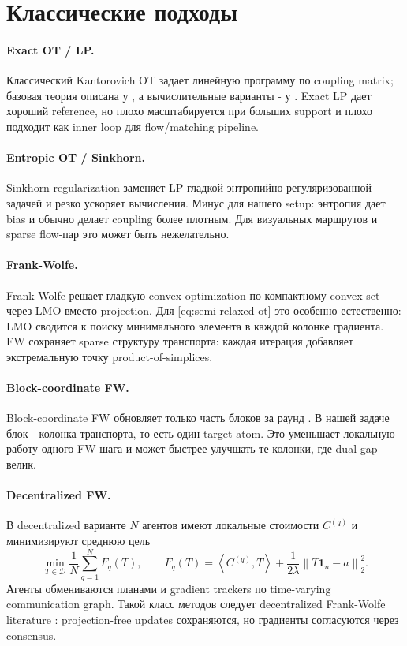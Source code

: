 \documentclass[11pt,a4paper]{article}
\newcommand{\one}{\mathbf{1}}
\newcommand{\ip}[2]{\left\langle #1,#2 \right\rangle}
\newcommand{\norm}[1]{\left\lVert #1 \right\rVert}
\begin{document}
\section{Классические подходы}

\paragraph{Exact OT / LP.}
Классический Kantorovich OT задает линейную программу по coupling matrix; базовая теория описана у \citet{villani2009optimal}, а вычислительные варианты - у \citet{peyre2019computational}. Exact LP дает хороший reference, но плохо масштабируется при больших support и плохо подходит как inner loop для flow/matching pipeline.

\paragraph{Entropic OT / Sinkhorn.}
Sinkhorn regularization \citep{cuturi2013sinkhorn} заменяет LP гладкой энтропийно-регуляризованной задачей и резко ускоряет вычисления. Минус для нашего setup: энтропия дает bias и обычно делает coupling более плотным. Для визуальных маршрутов и sparse flow-пар это может быть нежелательно.

\paragraph{Frank-Wolfe.}
Frank-Wolfe \citep{frank1956algorithm,jaggi2013revisiting} решает гладкую convex optimization по компактному convex set через LMO вместо projection. Для \eqref{eq:semi-relaxed-ot} это особенно естественно: LMO сводится к поиску минимального элемента в каждой колонке градиента. FW сохраняет sparse структуру транспорта: каждая итерация добавляет экстремальную точку product-of-simplices.

\paragraph{Block-coordinate FW.}
Block-coordinate FW обновляет только часть блоков за раунд \citep{lacostejulien2013block}. В нашей задаче блок - колонка транспорта, то есть один target atom. Это уменьшает локальную работу одного FW-шага и может быстрее улучшать те колонки, где dual gap велик.

\paragraph{Decentralized FW.}
В decentralized варианте \(N\) агентов имеют локальные стоимости \(C^{(q)}\) и минимизируют среднюю цель
\[
  \min_{T\in\mathcal{D}} \frac{1}{N}\sum_{q=1}^{N}F_q(T),
  \qquad
  F_q(T)=\ip{C^{(q)}}{T}+\frac{1}{2\lambda}\norm{T\one_n-a}_2^2.
\]
Агенты обмениваются планами и gradient trackers по time-varying communication graph. Такой класс методов следует decentralized Frank-Wolfe literature \citep{wai2017decentralized}: projection-free updates сохраняются, но градиенты согласуются через consensus.
\end{document}
